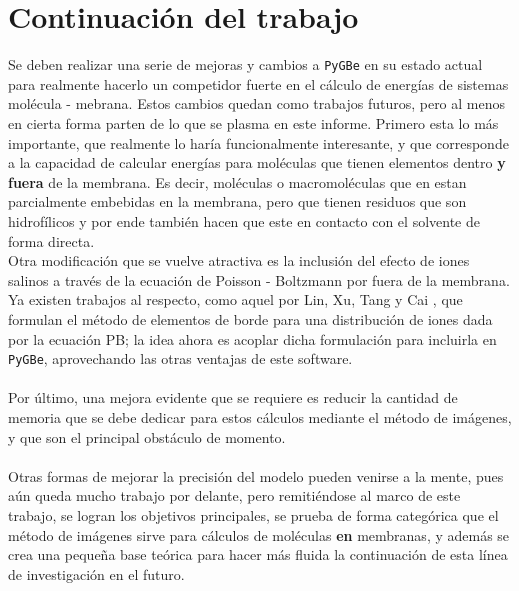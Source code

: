 \documentclass[12pt, oneside, numbers, spanish]{ezthesis}
\numberwithin{equation}{section}
\begin{document}
\section{Continuación del trabajo}
Se deben realizar una serie de mejoras y cambios a \texttt{PyGBe} en su estado actual para realmente hacerlo un competidor fuerte en el cálculo de energías de sistemas molécula - mebrana. Estos cambios quedan como trabajos futuros, pero al menos en cierta forma parten de lo que se plasma en este informe. Primero esta lo más importante, que realmente lo haría funcionalmente interesante, y que corresponde a la capacidad de calcular energías para moléculas que tienen elementos dentro \textbf{y fuera} de la membrana. Es decir, moléculas o macromoléculas que en estan parcialmente embebidas en la membrana, pero que tienen residuos que son hidrofílicos y por ende también hacen que este en contacto con el solvente de forma directa.\\
Otra modificación que se vuelve atractiva es la inclusión del efecto de iones salinos a través de la ecuación de Poisson - Boltzmann por fuera de la membrana. Ya existen trabajos al respecto, como aquel por Lin, Xu, Tang y Cai \cite{Huimin-Lin}, que formulan el método de elementos de borde para una distribución de iones dada por la ecuación PB; la idea ahora es acoplar dicha formulación para incluirla en \texttt{PyGBe}, aprovechando las otras ventajas de este software.\\\\
Por último, una mejora evidente que se requiere es reducir la cantidad de memoria que se debe dedicar para estos cálculos mediante el método de imágenes, y que son el principal obstáculo de momento.\\\\
Otras formas de mejorar la precisión del modelo pueden venirse a la mente, pues aún queda mucho trabajo por delante, pero remitiéndose al marco de este trabajo, se logran los objetivos principales, se prueba de forma categórica que el método de imágenes sirve para cálculos de moléculas \textbf{en} membranas, y además se crea una pequeña base teórica para hacer más fluida la continuación de esta línea de investigación en el futuro.
\end{document}
